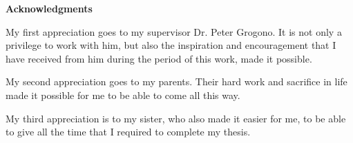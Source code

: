 \newpage
{}
\label{acknowledgments}
\begin{center}
\Large \textbf{Acknowledgments}\\[0.5cm]
\end{center}

My first appreciation goes to my supervisor Dr. Peter Grogono. It is not only a privilege to work with him, but also the inspiration and encouragement that I have received from him during the period of this work, made it possible.

My second appreciation goes to my parents. Their hard work and sacrifice in life made it possible for me to be able to come all this way.

My third appreciation is to my sister, who also made it easier for me, to be able to give all the time that I required to complete my thesis.
